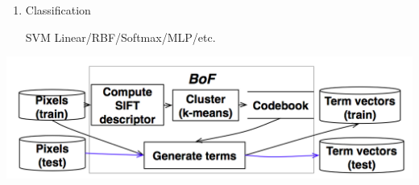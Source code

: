 \documentclass[landscape,a0paper,fontscale=0.285]{baposter}
\begin{document}
\begin{poster}
{\begin{enumerate}
\begin{itemize}
      Key points are densely sampled. Size of the codebook (K) is fixed at 1000/3000.
    \end{itemize}
  \item Classification

    SVM Linear/RBF/Softmax/MLP/etc.
\end{enumerate}
{\centering\includegraphics[width=1.00\linewidth]{bof}}
  }






\end{poster}
\end{document}
